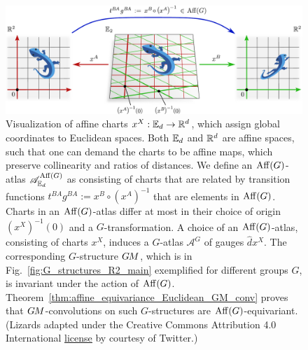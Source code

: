 \begin{figure}
    \centering
    \includegraphics[width=1.\textwidth]{figures/affine_charts.pdf}
    \vspace*{2ex}
    \caption{\small
        Visualization of affine charts $x^X: \mathbb{E}_d \to \mathbb{R}^d$, which assign global coordinates to Euclidean spaces.
        Both $\mathbb{E}_d$ and $\mathbb{R}^d$ are affine spaces, such that one can demand the charts to be affine maps, which preserve collinearity and ratios of distances.
        We define an $\operatorname{Aff}(G)$-atlas $\mathscr{A}^{\operatorname{Aff}(G)}_{\mathbb{E}_d}$ as consisting of charts that are related by transition functions $t^{BA} g^{BA} := x^B \circ (x^A)^{-1}$ that are elements in $\operatorname{Aff}(G)$.
        Charts in an $\operatorname{Aff}(G)$-atlas differ at most in their choice of origin $(x^X)^{-1}(0)$ and a $G$-transformation.
        A choice of an $\operatorname{Aff}(G)$-atlas, consisting of charts $x^X$, induces a $G$-atlas $\mathscr{A}^G$ of gauges $\hat{d}x^X$.
        The corresponding $G$-structure $G\mkern-1.4muM$, which is in Fig.~\ref{fig:G_structures_R2_main} exemplified for different groups $G$, is invariant under the action of $\operatorname{Aff}(G)$.
        Theorem~\ref{thm:affine_equivariance_Euclidean_GM_conv} proves that $G\mkern-1.4muM$-convolutions on such $G$-structures are $\operatorname{Aff}(G)$-equivariant.
        {\\
        \color{gray}
        \scriptsize
            (Lizards adapted under the Creative Commons Attribution 4.0 International
            \href{https://github.com/twitter/twemoji/blob/gh-pages/LICENSE-GRAPHICS}{\underline{license}}
            by courtesy of Twitter.)
        }
    }
    \label{fig:affine_charts}
\end{figure}


